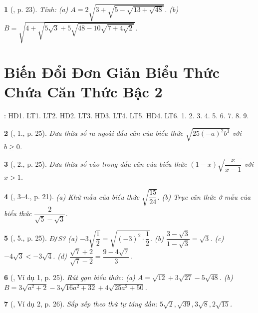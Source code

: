 \documentclass{article}
\newtheorem{baitoan}{}%
\begin{document}
\begin{baitoan}[\cite{Binh_boi_duong_Toan_9_tap_1}, p. 23]
	Tính: (a) $A = 2\sqrt{3 + \sqrt{5 - \sqrt{13 + \sqrt{48}}}}$. (b) $B = \sqrt{4 + \sqrt{5\sqrt{3} + 5\sqrt{48 - 10\sqrt{7 + 4\sqrt{2}}}}}$.
\end{baitoan}


\section{Biến Đổi Đơn Giản Biểu Thức Chứa Căn Thức Bậc 2}
\cite[Chap. III, \S3, pp. 61--71]{SGK_Toan_9_Canh_Dieu_tap_1}: HD1. LT1. LT2. HD2. LT3. HD3. LT4. LT5. HD4. LT6. 1. 2. 3. 4. 5. 6. 7. 8. 9.

\begin{baitoan}[\cite{Binh_boi_duong_Toan_9_tap_1}, 1., p. 25]
	Đưa thừa số ra ngoài dấu căn của biểu thức $\sqrt{25(-a)^2b^3}$ với $b\ge0$.
\end{baitoan}

\begin{baitoan}[\cite{Binh_boi_duong_Toan_9_tap_1}, 2., p. 25]
	Đưa thừa số vào trong dấu căn của biểu thức $(1 - x)\sqrt{\dfrac{x}{x - 1}}$ với $x > 1$.
\end{baitoan}

\begin{baitoan}[\cite{Binh_boi_duong_Toan_9_tap_1}, 3--4., p. 21]
	(a) Khử mẫu của biểu thức $\sqrt{\dfrac{15}{24}}$. (b) Trục căn thức ở mẫu của biểu thức $\dfrac{2}{\sqrt{5} - \sqrt{3}}$.
\end{baitoan}

\begin{baitoan}[\cite{Binh_boi_duong_Toan_9_tap_1}, 5., p. 25]
	{\rm Đ{\tt/}S?} (a) $-3\sqrt{\dfrac{1}{2}} = \sqrt{(-3)^2\cdot\dfrac{1}{2}}$. (b) $\dfrac{3 - \sqrt{3}}{1 - \sqrt{3}} = \sqrt{3}$. (c) $-4\sqrt{3} < -3\sqrt{4}$. (d) $\dfrac{\sqrt{7} + 2}{\sqrt{7} - 2} = \dfrac{9 - 4\sqrt{7}}{3}$.
\end{baitoan}

\begin{baitoan}[\cite{Binh_boi_duong_Toan_9_tap_1}, Ví dụ 1, p. 25]
	Rút gọn biểu thức: (a) $A = \sqrt{12} + 3\sqrt{27} - 5\sqrt{48}$. (b) $B = 3\sqrt{a^2 + 2} - 3\sqrt{16a^2 + 32} + 4\sqrt{25a^2 + 50}$.
\end{baitoan}

\begin{baitoan}[\cite{Binh_boi_duong_Toan_9_tap_1}, Ví dụ 2, p. 26]
	Sắp xếp theo thứ tự tăng dần: $5\sqrt{2},\sqrt{39},3\sqrt{8},2\sqrt{15}$.
\end{baitoan}
\end{document}
